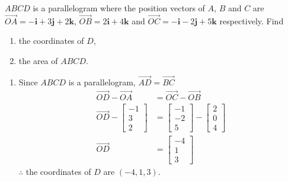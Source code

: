 \documentclass[11pt,a4paper]{book}
\begin{document}
\begin{example}

$ABCD$ is a parallelogram where the position vectors of $A$, $B$
and $C$ are $\overrightarrow{OA}=-\textbf{i}+3\textbf{j}+2\textbf{k}$,
$\overrightarrow{OB}=2\textbf{i}+4\textbf{k}$ and $\overrightarrow{OC}=-\textbf{i}-2\textbf{j}+5\textbf{k}$
respectively. Find

\begin{enumerate}[label=(\alph*)]

\item  the coordinates of $D$,

\item  the area of $ABCD$.

\end{enumerate}

\Solution

\begin{enumerate}[label=(\alph*)]

\item  Since $ABCD$ is a parallelogram, $\overrightarrow{AD}=\overrightarrow{BC}$
\begin{align*}
\overrightarrow{OD}-\overrightarrow{OA} & =\overrightarrow{OC}-\overrightarrow{OB}\\
\overrightarrow{OD}-\begin{bmatrix}-1\\
3\\
2
\end{bmatrix} & =\begin{bmatrix}-1\\
-2\\
5
\end{bmatrix}-\begin{bmatrix}2\\
0\\
4
\end{bmatrix}\\
\overrightarrow{OD} & =\begin{bmatrix}-4\\
1\\
3
\end{bmatrix}
\end{align*}
$\therefore$ the coordinates of $D$ are $\left(-4,1,3\right)$.


\end{enumerate}
\end{example}
\end{document}
